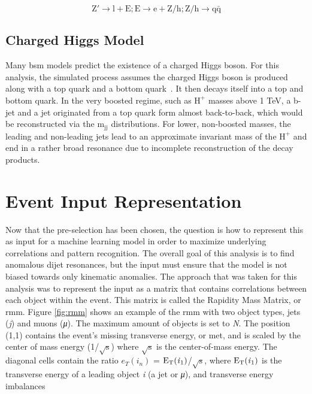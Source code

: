 \begin{equation}\label{eq:6.3}
\textrm{Z}' \to \textrm{l} + \textrm{E}; \textrm{E} \to \textrm{e} + \textrm{Z/h}; \textrm{Z/h} \to \textrm{q}\bar{\textrm{q}}
\tag{6.3}
\end{equation}

\subsection{Charged Higgs Model}

Many \gls{bsm} models predict the existence of a charged Higgs boson. For this analysis, the simulated process assumes the charged Higgs boson is produced along with a top quark and 
a bottom quark~\cite{ch-higg1}. It then decays itself into a top and bottom quark. In the very boosted regime, such as $\textrm{H}^{+}$ masses above 1 TeV, a b-jet and a jet originated from a top quark 
form almost back-to-back, which would be reconstructed via the $\textrm{m}_{\textrm{jj}}$ distributions. For lower, non-boosted masses, the leading and non-leading jets lead to 
an approximate invariant mass of the $\textrm{H}^{+}$ and end in a rather broad resonance due to incomplete reconstruction of the decay products. 

\section{Event Input Representation}\label{sec:evnt-input-rep}

Now that the pre-selection has been chosen, the question is how to represent this as input for a machine learning model in order to maximize underlying 
correlations and pattern recognition. The overall goal of this analysis is to find anomalous dijet resonances, but the input must ensure that the model is not biased towards 
only kinematic anomalies. The approach that was taken for this analysis was to represent the input as a matrix that contains correlations between each object within the event.
This matrix is called the Rapidity Mass Matrix, or \gls{rmm}. Figure \ref{fig:rmm} shows an example of the \gls{rmm} with two object types, jets (\textit{j}) and muons (\textit{μ}). The 
maximum amount of objects is set to \textit{N}. The position (1,1) contains the event's missing transverse energy, or \gls{met}, and is scaled by the center of mass energy (1/$\sqrt{\textrm{s}}$)
where $\sqrt{\textrm{s}}$ is the center-of-mass energy. The diagonal cells contain the ratio $e_T(i_n)$ = $\textrm{E}_{\textrm{T}}(\textrm{\textit{i}}_{\textrm{1}})$/$\sqrt{\textrm{s}}$,
where $\textrm{E}_{\textrm{T}}(\textrm{\textit{i}}_{\textrm{1}})$ is the transverse energy of a leading object \textit{i} (a jet or \textit{μ}), and transverse energy imbalances

